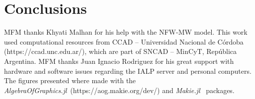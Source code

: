 \documentclass[twocolumn]{aa}
\begin{document}
\section{Conclusions}
\label{sec:conclusions}



\begin{acknowledgements}
    MFM thanks Khyati Malhan for his help with the NFW-MW model.
    This work used computational resources from CCAD – Universidad
    Nacional de Córdoba (https://ccad.unc.edu.ar/), which are part of SNCAD – MinCyT, República Argentina.
    MFM thanks Juan Ignacio Rodriguez for his great support with hardware and
    software issues regarding the IALP server and personal computers.
    The figures presented where made with the
    {\it AlgebraOfGraphics.jl}~(https://aog.makie.org/dev/) and
    {\it Makie.jl}~\citep{DanischKrumbiegel2021}
    packages.
\end{acknowledgements}

%
%
%
\end{document}
